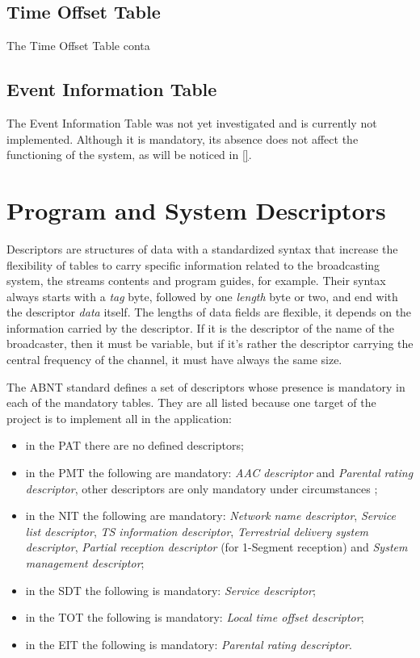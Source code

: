\documentclass[
	12pt,				%
	openright,			%
	twoside,			%
	a4paper,			%
	brazil,
	french,				%
	english
	]{abntex2}
\begin{document}
\subsection{Time Offset Table}
\label{TOT}
The Time Offset Table conta

\subsection{Event Information Table}
\label{EIT}
The Event Information Table was not yet investigated and is currently not implemented. Although it is mandatory, its absence does not affect the functioning of the system, as will be noticed in \autoref{}.

\section{Program and System Descriptors}
\label{descriptors}
Descriptors are structures of data with a standardized syntax that increase the flexibility of tables to carry specific information related to the broadcasting system, the streams contents and program guides, for example. Their syntax always starts with a \textit{tag} byte, followed by one \textit{length} byte or two, and end with the descriptor \textit{data} itself. The lengths of data fields are flexible, it depends on the information carried by the descriptor. If it is the descriptor of the name of the broadcaster, then it must be variable, but if it's rather the descriptor carrying the central frequency of the channel, it must have always the same size.

The ABNT standard defines a set of descriptors whose presence is mandatory in each of the mandatory tables. They are all listed because one target of the project is to implement all in the application:

\begin{itemize}

\item in the PAT there are no defined descriptors;
\item in the PMT the following are mandatory: \textit{AAC descriptor} and \textit{Parental rating descriptor}, other descriptors are only mandatory under circumstances ;
\item in the NIT the following are mandatory: \textit{Network name descriptor}, \textit{Service list descriptor}, \textit{TS information descriptor}, \textit{Terrestrial delivery system descriptor}, \textit{Partial reception descriptor} (for 1-Segment reception) and \textit{System management descriptor};
\item in the SDT the following is mandatory: \textit{Service descriptor};
\item in the TOT the following is mandatory: \textit{Local time offset descriptor};
\item in the EIT the following is mandatory: \textit{Parental rating descriptor}.
\end{itemize}
\end{document}
